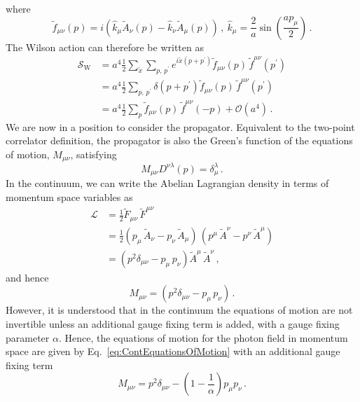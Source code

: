 %
where
%
\begin{equation}
\tilde{f}_{\mu\nu}(p) = i\left(\hat{k}_\mu \tilde{A}_\nu(p) - \hat{k}_\nu \tilde{A}_\mu(p)\right)\, ,~\hat{k}_\mu = \frac{2}{a}\sin\left(\frac{ap_\mu}{2}\right)\, .
\end{equation}
%
The Wilson action can therefore be written as
%
\begin{align}
\mathcal{S}_\text{W} &= a^4\frac{1}{2}\sum_{\tilde{x}}\sum_{p,\,p^\prime}e^{i\tilde{x}(p+p^\prime)}\tilde{f}_{\mu\nu}(p) \, \tilde{f}^{\mu\nu}(p^\prime)\nonumber\\
&=a^4\frac{1}{2}\sum_{p,\,p^\prime} \delta(p+p^\prime)\tilde{f}_{\mu\nu}(p) \, \tilde{f}^{\mu\nu}(p^\prime) \nonumber\\
&= a^4\frac{1}{2}\sum_{p}\tilde{f}_{\mu\nu}(p) \, \tilde{f}^{\mu\nu}(-p) + \mathcal{O}(a^4)\, . \label{eq:WilsonMomentum}
\end{align}
%
We are now in a position to consider the propagator. Equivalent to the two-point correlator definition, the propagator is also the Green's function of the equations of motion, $M_{\mu\nu}$, satisfying
%
\begin{equation}
M_{\mu\nu}D^{\nu\lambda}(p) = \delta_\mu^\lambda\, .
\end{equation}
%
In the continuum, we can write the Abelian Lagrangian density in terms of momentum space variables as 
%
\begin{align}
\mathcal{L} &= \frac{1}{2}\tilde{F}_{\mu\nu}\,\tilde{F}^{\mu\nu}\nonumber\\
&= \frac{1}{2}(p_\mu\,\tilde{A}_\nu - p_\nu\,\tilde{A}_\mu)\,(p^\mu\,\tilde{A}^\nu - p^\nu\,\tilde{A}^\mu)\nonumber\\
&= (p^2\delta_{\mu\nu} - p_\mu\,p_\nu)\tilde{A}^\mu\,\tilde{A}^\nu\, ,
\end{align}
%
and hence
%
\begin{equation}
M_{\mu\nu} = (p^2\delta_{\mu\nu} - p_\mu\,p_\nu)\, .
\label{eq:ContEquationsOfMotion}
\end{equation}
%
However, it is understood that in the continuum the equations of motion are not invertible unless an additional gauge fixing term is added, with a gauge fixing parameter $\alpha$. Hence, the equations of motion for the photon field in momentum space are given by Eq.~\eqref{eq:ContEquationsOfMotion} with an additional gauge fixing term~\cite{ryder1996quantum}
%
\begin{equation}
M_{\mu\nu} = p^2\delta_{\mu\nu} - \left(1-\frac{1}{\alpha}\right)p_\mu p_\nu\, .
\end{equation}

